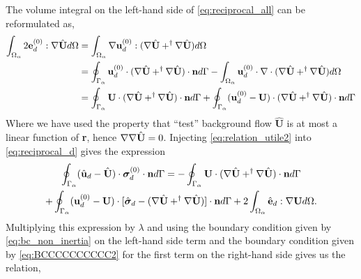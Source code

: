 The volume integral on the left-hand side of \ref{eq:reciprocal_all} can be reformulated as,
\begin{align}
    \intO{ 2\textbf{e}_d^{(0)} : \grad \hat{\textbf{U}} }
    &=\intO{ \grad \textbf{u}_d^{(0)} : (\grad \hat{\textbf{U}} +^\dagger \grad \hat{\textbf{U}}) }\\
    &=
    \intS{  \textbf{u}_d^{(0)} \cdot (\grad \hat{\textbf{U}} + ^\dagger\grad \hat{\textbf{U}})  \cdot \textbf{n}}
    - \intO{  \textbf{u}_d^{(0)} \cdot \div(\grad \hat{\textbf{U}} + ^\dagger\grad \hat{\textbf{U}})}
    \label{eq:relation_utile}
    \\
    &=
    \intS{  \textbf{U} \cdot (\grad \hat{\textbf{U}} + ^\dagger\grad \hat{\textbf{U}})  \cdot \textbf{n}}
    + \intS{  (\textbf{u}_d^{(0)} - \textbf{U})\cdot (\grad \hat{\textbf{U}} + ^\dagger\grad \hat{\textbf{U}})  \cdot \textbf{n}}
    \label{eq:relation_utile2}
\end{align}
Where we have used the property that ``test'' background flow $\hat{\textbf{U}}$ is at most a linear function of \textbf{r}, hence $\mathbf{\nabla}\mathbf{\nabla} \hat{\textbf{U}} = 0$. 
Injecting \ref{eq:relation_utile2} into \ref{eq:reciprocal_d} gives the expression
\begin{multline}
    \oint_{\Gamma_{\alpha}} (\hat{\textbf{u}}_d - \hat{\textbf{U}})\cdot \bm\sigma_d^{(0)} \cdot \textbf{n} d\Gamma
    =
    - \oint_{\Gamma_{\alpha}}   \textbf{U} \cdot (\mathbf{\nabla} \hat{\textbf{U}} + ^\dagger\mathbf{\nabla} \hat{\textbf{U}})  \cdot \textbf{n} d\Gamma\\
    + \oint_{\Gamma_{\alpha}} (\textbf{u}_d^{(0)} - \textbf{U}) \cdot  [\hat{\bm\sigma}_d -(\mathbf{\nabla} \hat{\textbf{U}} + ^\dagger\mathbf{\nabla} \hat{\textbf{U}})]\cdot \textbf{n}  d\Gamma
    + 2\int_{\Omega_{\alpha}} \hat{\textbf{e}}_d : \mathbf{\nabla} \textbf{U} d\Omega. 
\end{multline}
Multiplying this expression by $\lambda$ and using the boundary condition given by \ref{eq:bc_non_inertia} on the left-hand side term and the boundary condition given by \ref{eq:BCCCCCCCCCC2} for the first term on the right-hand side gives us the relation,
